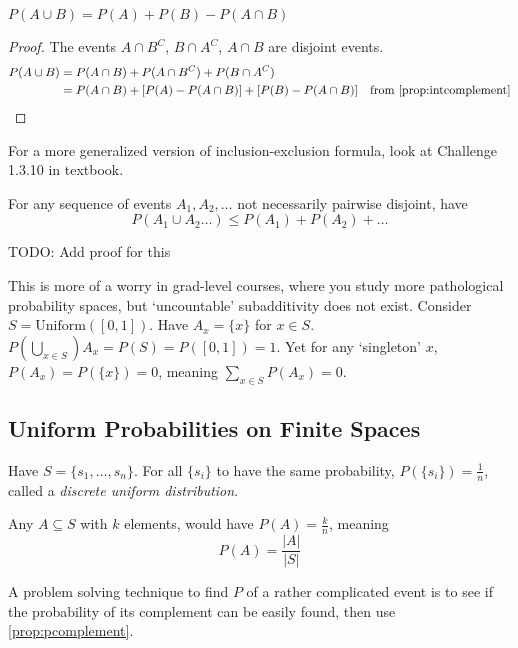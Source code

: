 \begin{simplethm}
    $P(A \cup B) = P(A) + P(B) - P(A \cap B)$ \label{prop:inclexcl} 
\end{simplethm}
\begin{proof}
The events $A \cap B^C$, $B \cap A^C$, $A \cap B$ are disjoint events. 
\begin{align*}
    P(A \cup B) &= P(A \cap B) + P(A \cap B^C) + P(B \cap A^C) \\
    &= P(A \cap B) + [P(A) - P(A \cap B)] + [P(B) - P(A \cap B)] & \text{from } \ref{prop:intcomplement}
\end{align*}
\end{proof}
\noindent For a more generalized version of inclusion-exclusion formula, look at Challenge 1.3.10 in textbook.

\begin{simplethm}[Subadditivity]
For any sequence of events $A_1, A_2, \dots$ not necessarily pairwise disjoint, have
\[
    P(A_1 \cup A_2 \dots) \leq P(A_1) + P(A_2) + \dots
\]
\end{simplethm}

TODO: Add proof for this

\begin{remark}
    This is more of a worry in grad-level courses, where you study more pathological probability spaces, but `uncountable' subadditivity does not exist. Consider $S = \text{Uniform}([0, 1])$. Have $A_x = \{ x \}$ for $x \in S$. $P(\bigcup_{x \in S}) A_x = P(S) = P([0, 1]) = 1$. Yet for any `singleton' $x$, $P(A_x) = P(\{ x \}) = 0$, meaning $\sum_{x \in S} P(A_x) = 0$.
\end{remark}

\subsection{Uniform Probabilities on Finite Spaces}
Have $S = \{ s_1, \dots ,s_n \}$. For all $\{ s_i \}$ to have the same probability, $P(\{ s_i \}) = \frac{1}{n}$, called a \textit{discrete uniform distribution}. 

Any $A \subseteq S$ with $k$ elements, would have $P(A) = \frac{k}{n}$, meaning
\[
P(A) = \frac{|A|}{|S|}
\]

A problem solving technique to find $P$ of a rather complicated event is to see if the probability of its complement can be easily found, then use \ref{prop:pcomplement}.
